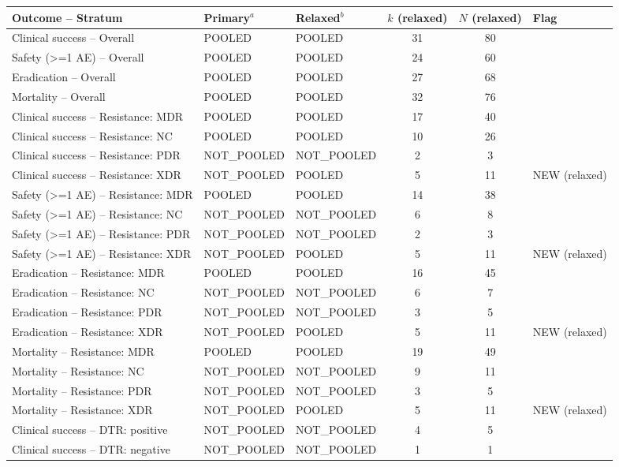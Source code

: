 \begin{tabular}{lllccl}
\toprule
Outcome -- Stratum & Primary$^a$ & Relaxed$^b$ & $k$ (relaxed) & $N$ (relaxed) & Flag \\
\midrule
Clinical success -- Overall & POOLED & POOLED & 31 & 80 &  \\
Safety (>=1 AE) -- Overall & POOLED & POOLED & 24 & 60 &  \\
Eradication -- Overall & POOLED & POOLED & 27 & 68 &  \\
Mortality -- Overall & POOLED & POOLED & 32 & 76 &  \\
Clinical success -- Resistance: MDR & POOLED & POOLED & 17 & 40 &  \\
Clinical success -- Resistance: NC & POOLED & POOLED & 10 & 26 &  \\
Clinical success -- Resistance: PDR & NOT\_POOLED & NOT\_POOLED & 2 & 3 &  \\
Clinical success -- Resistance: XDR & NOT\_POOLED & POOLED & 5 & 11 & NEW (relaxed) \\
Safety (>=1 AE) -- Resistance: MDR & POOLED & POOLED & 14 & 38 &  \\
Safety (>=1 AE) -- Resistance: NC & NOT\_POOLED & NOT\_POOLED & 6 & 8 &  \\
Safety (>=1 AE) -- Resistance: PDR & NOT\_POOLED & NOT\_POOLED & 2 & 3 &  \\
Safety (>=1 AE) -- Resistance: XDR & NOT\_POOLED & POOLED & 5 & 11 & NEW (relaxed) \\
Eradication -- Resistance: MDR & POOLED & POOLED & 16 & 45 &  \\
Eradication -- Resistance: NC & NOT\_POOLED & NOT\_POOLED & 6 & 7 &  \\
Eradication -- Resistance: PDR & NOT\_POOLED & NOT\_POOLED & 3 & 5 &  \\
Eradication -- Resistance: XDR & NOT\_POOLED & POOLED & 5 & 11 & NEW (relaxed) \\
Mortality -- Resistance: MDR & POOLED & POOLED & 19 & 49 &  \\
Mortality -- Resistance: NC & NOT\_POOLED & NOT\_POOLED & 9 & 11 &  \\
Mortality -- Resistance: PDR & NOT\_POOLED & NOT\_POOLED & 3 & 5 &  \\
Mortality -- Resistance: XDR & NOT\_POOLED & POOLED & 5 & 11 & NEW (relaxed) \\
Clinical success -- DTR: positive & NOT\_POOLED & NOT\_POOLED & 4 & 5 &  \\
Clinical success -- DTR: negative & NOT\_POOLED & NOT\_POOLED & 1 & 1 &  \\

\end{tabular}
